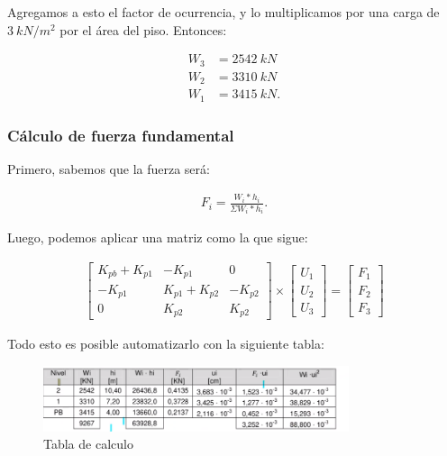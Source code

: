 \documentclass[../main.tex]{subfiles}
\begin{document}
Agregamos a esto el factor de ocurrencia, y lo multiplicamos por una carga de
$\SI{3}{kN / m^2}$ por el área del piso. Entonces:

\begin{align*}
  W_3 &= \SI{2542}{kN} \\[5pt]
  W_2 &= \SI{3310}{kN} \\[5pt]
  W_1 &= \SI{3415}{kN}
.\end{align*}

\subsubsection{Cálculo de fuerza fundamental}

Primero, sabemos que la fuerza será:

\begin{align*}
  F_i = \frac{W_i*h_i}{\Sigma W_i * h_i}
.\end{align*}

Luego, podemos aplicar una matriz como la que sigue:

\begin{align*}
\begin{bmatrix} 
  K_{pb}+K_{p1} & -K_{p1}       & 0 \\
  -K_{p1}       & K_{p1}+K_{p2} & -K_{p2} \\
  0             & K_{p2}        & K_{p2} 
\end{bmatrix} 
\times \begin{bmatrix} U_1 \\ U_2 \\ U_3 \end{bmatrix} 
= \begin{bmatrix} F_1 \\ F_2 \\ F_3 \end{bmatrix} 
\tag{Matriz deformaciones}\label{matriz-def}\end{align*}

Todo esto es posible automatizarlo con la siguiente tabla:

\begin{figure}[ht]
  \centering
  \includegraphics[width=0.8\textwidth]{./images/20210420/tabla_calc}
  \caption{Tabla de calculo}
  \label{fig:tabla_calc}
\end{figure}
\end{document}
